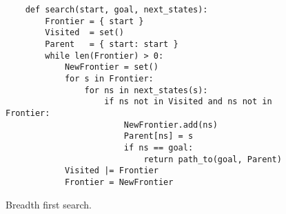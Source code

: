 \begin{figure}[!ht]
\centering
\begin{verbatim}
    def search(start, goal, next_states):
        Frontier = { start }
        Visited  = set()
        Parent   = { start: start }
        while len(Frontier) > 0:
            NewFrontier = set()
            for s in Frontier:
                for ns in next_states(s):
                    if ns not in Visited and ns not in Frontier:
                        NewFrontier.add(ns)
                        Parent[ns] = s
                        if ns == goal:
                            return path_to(goal, Parent)
            Visited |= Frontier
            Frontier = NewFrontier
\end{verbatim}
\vspace*{-0.3cm}
\caption{Breadth first search.}
\label{fig:Breadth-First-Search.ipynb}
\end{figure}
\vspace*{0.2cm}

